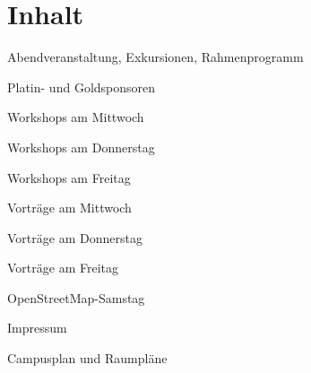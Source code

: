 \section*{Inhalt}
\label{contents}
\newlength\contentspace
\setlength\contentspace{0.2em}

\vspace*{\contentspace}%
\noindent Abendveranstaltung, Exkursionen, Rahmenprogramm  \dotfill \pageref{schwaetzli}

\vspace*{\contentspace}%
\noindent Platin- und Goldsponsoren \dotfill \pageref{platinsposoren}

\vspace*{\contentspace}%
\noindent Workshops am Mittwoch \dotfill \pageref{mittwoch-workshops}

\vspace*{\contentspace}%
\noindent Workshops am Donnerstag \dotfill \pageref{donnerstag-workshops}

\vspace*{\contentspace}%
\noindent Workshops am Freitag \dotfill \pageref{freitag-workshops}

\vspace*{\contentspace}%
\noindent Vorträge am Mittwoch \dotfill \pageref{mittwoch}

\vspace*{\contentspace}%
\noindent Vorträge am Donnerstag \dotfill \pageref{donnerstag}

\vspace*{\contentspace}%
\noindent Vorträge am Freitag \dotfill \pageref{freitag}

\vspace*{\contentspace}%
\noindent OpenStreetMap-Samstag \dotfill \pageref{samstag}

\vspace*{\contentspace}%
\noindent Impressum \dotfill \pageref{impressum}

\vspace*{\contentspace}%
\noindent Campusplan und Raumpläne \dotfill \pageref{kartenseiten}

\justifying

\newpage
